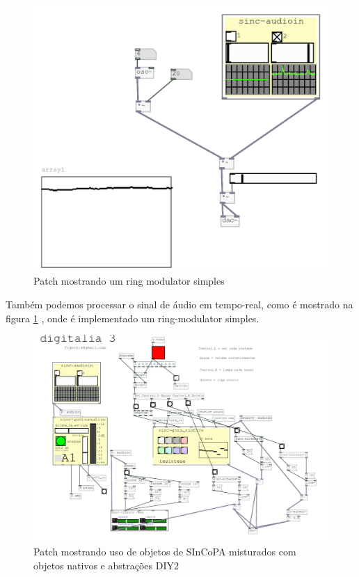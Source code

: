 \documentclass[draft]{ppgmus}
\begin{document}
\begin{figure}
\includegraphics[scale=.7]{sinc-ring}
\caption{Patch mostrando um ring modulator simples}
\label{sinc-ring}
\end{figure}


Também podemos processar o sinal de áudio em tempo-real, como é mostrado na 
figura \ref{sinc-ring} , onde é implementado um ring-modulator simples.


\begin{figure}
\includegraphics[scale=.55]{digitalia3}
\caption{Patch mostrando uso de objetos de SInCoPA misturados com objetos nativos e abstrações DIY2}
\label{digitalia3}
\end{figure}
\end{document}
